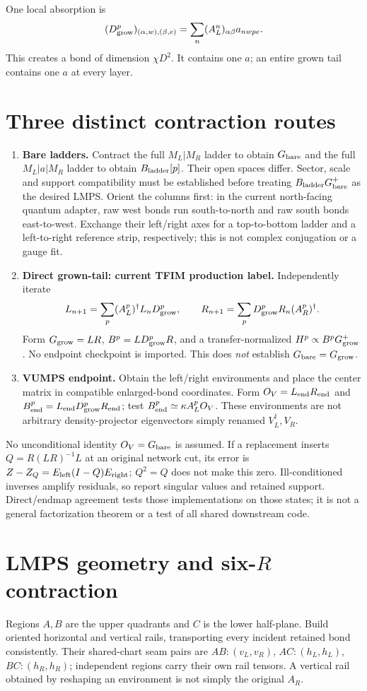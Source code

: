 \documentclass[11pt]{article}
\newcommand{\Dg}{D_{\rm grow}}
\begin{document}
One local absorption is
\[
 (\Dg^p)_{(\alpha,w),(\beta,e)}
 =\sum_n(A_L^n)_{\alpha\beta}a_{nwpe}.
\]
This creates a bond of dimension $\chi D^2$. It contains one $a$; an entire
grown tail contains one $a$ at every layer.

\section{Three distinct contraction routes}
\begin{enumerate}
\item \textbf{Bare ladders.} Contract the full $M_L|M_R$ ladder to obtain
$G_{\rm bare}$ and the full $M_L|a|M_R$ ladder to obtain $B_{\rm ladder}[p]$.
Their open spaces differ. Sector, scale and support compatibility must be
established before treating $B_{\rm ladder}G_{\rm bare}^{+}$ as the desired LMPS.
Orient the columns first: in the current north-facing quantum adapter, raw
west bonds run south-to-north and raw south bonds east-to-west. Exchange
their left/right axes for a top-to-bottom ladder and a left-to-right reference
strip, respectively; this is not complex conjugation or a gauge fit.
\item \textbf{Direct grown-tail: current TFIM production label.} Independently iterate
\[
 L_{n+1}=\sum_p(A_L^p)^\dagger L_n\Dg^p,\qquad
 R_{n+1}=\sum_p\Dg^pR_n(A_R^p)^\dagger.
\]
Form $G_{\rm grow}=LR$, $B^p=L\Dg^pR$, and a transfer-normalized
$H^p\propto B^pG_{\rm grow}^+$. No endpoint checkpoint is imported. This
does \emph{not} establish $G_{\rm bare}=G_{\rm grow}$.
\item \textbf{VUMPS endpoint.} Obtain the left/right environments and place the
center matrix in compatible enlarged-bond coordinates. Form
$O_V=L_{\rm end}R_{\rm end}$ and
$B_{\rm end}^p=L_{\rm end}\Dg^pR_{\rm end}$; test
$B_{\rm end}^p\simeq\kappa A_L^pO_V$. These environments are not arbitrary
density-projector eigenvectors simply renamed $V_L^\dagger,V_R$.
\end{enumerate}

No unconditional identity $O_V=G_{\rm bare}$ is assumed. If a replacement
inserts $Q=R(LR)^{-1}L$ at an original network cut, its error is
$Z-Z_Q=E_{\rm left}(I-Q)E_{\rm right}$; $Q^2=Q$ does not make this zero.
Ill-conditioned inverses amplify residuals, so report singular values and
retained support. Direct/endmap agreement tests those implementations on
those states; it is not a general factorization theorem or a test of all
shared downstream code.

\section{LMPS geometry and six-$R$ contraction}
Regions $A,B$ are the upper quadrants and $C$ is the lower half-plane. Build
oriented horizontal and vertical rails, transporting every incident retained
bond consistently. Their shared-chart seam pairs are
$AB:(v_L,v_R)$, $AC:(h_L,h_L)$, $BC:(h_R,h_R)$; independent regions carry
their own rail tensors. A vertical rail obtained by reshaping an environment
is not simply the original $A_R$.
\end{document}
